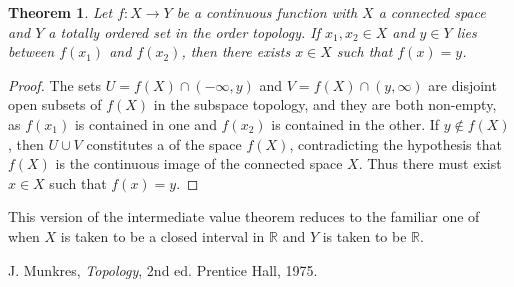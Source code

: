 \documentclass[12pt]{article}
\theoremstyle{plain}
\newtheorem*{thm*}{Theorem}
\begin{document}
\begin{thm*}
Let $f:X\rightarrow Y$ be a continuous function with $X$ a connected space and $Y$ a totally ordered set in the order topology. If $x_1,x_2\in X$ and $y\in Y$ lies between $f(x_1)$ and $f(x_2)$, then there exists $x\in X$ such that $f(x)=y$.
\end{thm*}
\begin{proof}
The sets $U=f(X)\cap(-\infty,y)$ and $V=f(X)\cap(y,\infty)$ are disjoint open subsets of $f(X)$ in the subspace topology, and they are both non-empty, as $f(x_1)$ is contained in one and $f(x_2)$ is contained in the other. If $y\notin f(X)$, then $U\cup V$ constitutes a  of the space $f(X)$, contradicting the hypothesis that $f(X)$ is the continuous image of the connected space $X$. Thus there must exist $x\in X$ such that $f(x)=y$.
\end{proof}
This version of the intermediate value theorem reduces to the familiar one of  when $X$ is taken to be a closed interval in $\mathbb{R}$ and $Y$ is taken to be $\mathbb{R}$. 

\begin{thebibliography}{1}
J. Munkres, \emph{Topology}, 2nd ed. Prentice Hall, 1975.
\end{thebibliography}
\end{document}
